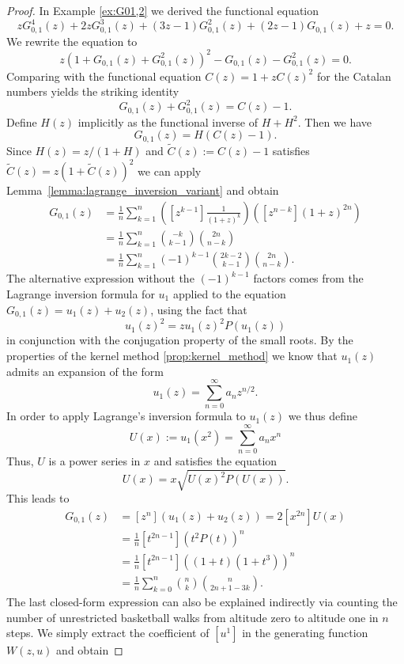 \begin{proof}
  In Example \ref{ex:G01,2} we derived the functional equation
  $$
    zG_{0,1}^{4}(z) + 2zG_{0,1}^{3}(z) + (3z-1)G_{0,1}^{2}(z) + (2z-1)G_{0,1}(z) + z = 0.
  $$
  We rewrite the equation to
  $$
    z(1+G_{0,1}(z) + G_{0,1}^{2}(z))^{2} - G_{0,1}(z) - G_{0,1}^{2}(z) = 0.
  $$
  Comparing with the functional equation $C(z) = 1 + zC(z)^{2}$ for the Catalan numbers yields the striking identity
  $$
    G_{0,1}(z) + G_{0,1}^{2}(z) = C(z) - 1.
  $$
  Define $H(z)$ implicitly as the functional inverse of $H + H^{2}$. Then we have 
  $$
    G_{0,1}(z) = H(C(z) - 1).
  $$
  Since $H(z) = z/(1+H)$ and $\tilde{C}(z) := C(z) - 1$ satisfies $\tilde{C}(z) = z(1 + \tilde{C}(z))^2$ we can apply Lemma~\ref{lemma:lagrange_inversion_variant} and obtain
  \begin{align*}
    [z^{n}]G_{0,1}(z) &= 
    \frac{1}{n}\sum_{k=1}^{n}
    \left(
      [z^{k-1}] \frac{1}{(1+z)^{k}}
    \right)
    \left(
      [z^{n-k}](1+z)^{2n}
    \right) \\
    &= \frac{1}{n}\sum_{k=1}^{n}\binom{-k}{k-1}\binom{2n}{n-k} \\
    &= \frac{1}{n}\sum_{k=1}^{n}(-1)^{k-1}\binom{2k-2}{k-1}\binom{2n}{n-k}.
  \end{align*}
  The alternative expression without the $(-1)^{k-1}$ factors comes from the Lagrange inversion formula for $u_{1}$ applied to the equation $G_{0,1}(z) = u_{1}(z) + u_{2}(z)$, using the fact that 
  $$
  u_{1}(z)^{2}= z u_{1}(z)^2P(u_{1}(z))
  $$ 
  in conjunction with the conjugation property of the small roots. By the properties of the kernel method \ref{prop:kernel_method} we know that $u_1(z)$ admits an expansion of the form
  $$
    u_1(z) = \sum_{n = 0}^\infty a_n z^{n/2}.
  $$
  In order to apply Lagrange's inversion formula to $u_1(z)$ we thus define $$
    U(x) := u_1\left(x^2\right) = \sum_{n = 0}^\infty a_{n} x^n
  $$
  Thus, $U$ is a power series in $x$ and satisfies the equation
  $$
    U(x) = x \sqrt{U(x)^2 P(U(x))}.
  $$
  This leads to
  \begin{align*}
    [z^{n}]G_{0,1}(z) &= 
    [z^{n}](u_{1}(z) + u_{2}(z)) = 
    2[x^{2n}]U(x) \\
    &= \frac{1}{n} [t^{2n-1}] (t^2P(t))^n \\
    &= \frac{1}{n} [t^{2n-1}] ((1+t)(1+t^3))^n \\
    &= \frac{1}{n}\sum_{k=0}^{n}\binom{n}{k}\binom{n}{2n+1-3k}.
  \end{align*}
  The last closed-form expression can also be explained indirectly via counting the number of unrestricted basketball walks from altitude zero to altitude one in $n$ steps. We simply extract the coefficient of $[u^{1}]$ in the generating function $W(z,u)$ and obtain

\end{proof}

